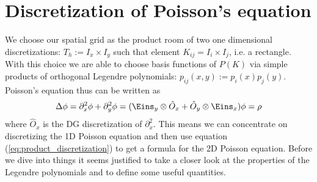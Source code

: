 \documentclass[a4paper,12pt]{scrartcl}
\begin{document}
\section{ Discretization of Poisson's equation}
We choose our spatial grid as the product room of two one dimensional
discretizations: $T_h := I_x \times I_y$ such that element $K_{ij} = I_i \times I_j$,
i.e. a rectangle. With this choice we are able to choose basis functions 
of $P(K)$ via simple products of orthogonal Legendre polynomials: 
$p_{ij}(x,y) := p_i(x) p_j(y)$. Poisson's equation thus can be written as
\begin{align}
    \Delta \phi = \partial_x^2 \phi + \partial_y^2 \phi = (\Eins_y \otimes \hat O_x + \hat O_y \otimes \Eins_x) \phi = \rho
    \label{eq:product_discretization}
\end{align}
where $\hat O_x$ is the DG discretization of $\partial_x^2$. This means we 
can concentrate on discretizing the 1D Poisson equation and then use
equation (\ref{eq:product_discretization}) to get a formula for the 2D Poisson 
equation.
Before we dive into things it seems justified to take a closer look at the 
properties of the Legendre polynomials and to define some useful quantities.
\end{document}
